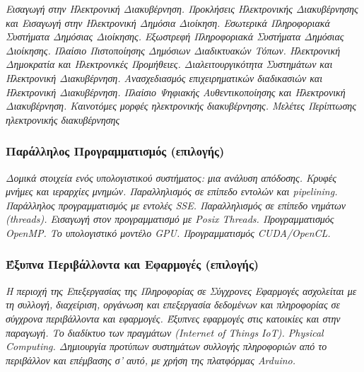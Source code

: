 \emph{Εισαγωγή στην Ηλεκτρονική Διακυβέρνηση. Προκλήσεις Ηλεκτρονικής
Διακυβέρνησης και Εισαγωγή στην Ηλεκτρονική Δημόσια Διοίκηση. Εσωτερικά
Πληροφοριακά Συστήματα Δημόσιας Διοίκησης. Εξωστρεφή Πληροφοριακά
Συστήματα Δημόσιας Διοίκησης. Πλαίσιο Πιστοποίησης Δημόσιων Διαδικτυακών
Τόπων. Ηλεκτρονική Δημοκρατία και Ηλεκτρονικές Προμήθειες.
Διαλειτουργικότητα Συστημάτων και Ηλεκτρονική Διακυβέρνηση.
Ανασχεδιασμός επιχειρηματικών διαδικασιών και Ηλεκτρονική Διακυβέρνηση.
Πλαίσιο Ψηφιακής Αυθεντικοποίησης και Ηλεκτρονική Διακυβέρνηση.
Καινοτόμες μορφές ηλεκτρονικής διακυβέρνησης. Μελέτες Περίπτωσης
ηλεκτρονικής διακυβέρνησης}

\hypertarget{ux3c0ux3b1ux3c1ux3acux3bbux3bbux3b7ux3bbux3bfux3c2-ux3c0ux3c1ux3bfux3b3ux3c1ux3b1ux3bcux3bcux3b1ux3c4ux3b9ux3c3ux3bcux3ccux3c2-ux3b5ux3c0ux3b9ux3bbux3bfux3b3ux3aeux3c2}{%
\subsubsection{Παράλληλος Προγραμματισμός
(επιλογής)}\label{ux3c0ux3b1ux3c1ux3acux3bbux3bbux3b7ux3bbux3bfux3c2-ux3c0ux3c1ux3bfux3b3ux3c1ux3b1ux3bcux3bcux3b1ux3c4ux3b9ux3c3ux3bcux3ccux3c2-ux3b5ux3c0ux3b9ux3bbux3bfux3b3ux3aeux3c2}}

\emph{Δομικά στοιχεία ενός υπολογιστικού συστήματος: μια ανάλυση
απόδοσης. Κρυφές μνήμες και ιεραρχίες μνημών. Παραλληλισμός σε επίπεδο
εντολών και pipelining. Παράλληλος προγραμματισμός με εντολές SSE.
Παραλληλισμός σε επίπεδο νημάτων (threads). Εισαγωγή στον προγραμματισμό
με Posix Threads. Προγραμματισμός OpenMP. Το υπολογιστικό μοντέλο GPU.
Προγραμματισμός CUDA/OpenCL.}

\hypertarget{ux3adux3beux3c5ux3c0ux3bdux3b1-ux3c0ux3b5ux3c1ux3b9ux3b2ux3acux3bbux3bbux3bfux3bdux3c4ux3b1-ux3baux3b1ux3b9-ux3b5ux3c6ux3b1ux3c1ux3bcux3bfux3b3ux3adux3c2-ux3b5ux3c0ux3b9ux3bbux3bfux3b3ux3aeux3c2}{%
\subsubsection{Έξυπνα Περιβάλλοντα και Εφαρμογές
(επιλογής)}\label{ux3adux3beux3c5ux3c0ux3bdux3b1-ux3c0ux3b5ux3c1ux3b9ux3b2ux3acux3bbux3bbux3bfux3bdux3c4ux3b1-ux3baux3b1ux3b9-ux3b5ux3c6ux3b1ux3c1ux3bcux3bfux3b3ux3adux3c2-ux3b5ux3c0ux3b9ux3bbux3bfux3b3ux3aeux3c2}}

\emph{H περιοχή της Επεξεργασίας της Πληροφορίας σε Σύγχρονες Εφαρμογές
ασχολείται με τη συλλογή, διαχείριση, οργάνωση και επεξεργασία δεδομένων
και πληροφορίας σε σύγχρονα περιβάλλοντα και εφαρμογές. Έξυπνες
εφαρμογές στις κατοικίες και στην παραγωγή. Το διαδίκτυο των πραγμάτων
(Internet of Things IoT). Physical Computing. Δημιουργία προτύπων
συστημάτων συλλογής πληροφοριών από το περιβάλλον και επέμβασης σ' αυτό,
με χρήση της πλατφόρμας Arduino.}

